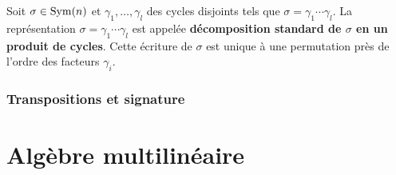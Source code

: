 \documentclass[french]{book}
\begin{document}
\begin{definition}
  Soit $\sigma \in \operatorname{Sym}(n)$ et $\gamma_1, \dots, \gamma_l$ des cycles disjoints tels que $\sigma = \gamma_1 \cdots \gamma_l$. La représentation $\sigma = \gamma_1 \cdots \gamma_l$ est appelée \textbf{décomposition standard de $\sigma$ en un produit de cycles}. Cette écriture de $\sigma$ est unique à une permutation près de l'ordre des facteurs $\gamma_i$.
\end{definition}

\section{Transpositions et signature}

\part{Algèbre multilinéaire}

\end{document}
